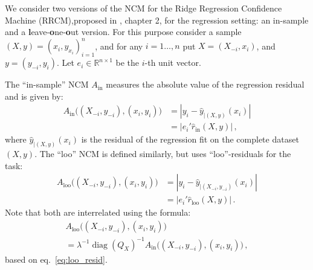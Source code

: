 \documentclass[a4paper,14pt]{extarticle}
\newcommand{\Real}{\mathbb{R}}
\newcommand{\diag}{\mathop{\text{diag}}\nolimits}
\begin{document}
We consider two versions of the NCM for the Ridge Regression Confidence Machine
(RRCM),proposed in \cite{vovk2005}, chapter 2, for the regression setting: an in-sample
and a \textbf{l}eave-\textbf{o}ne-\textbf{o}ut version. For this purpose consider
a sample $(X, y) = (x_i, y_{x_i})_{i=1}^n$, and for any $i=1\ldots, n$ put $X =
(X_{-i}, x_i)$, and $y = (y_{-i}, y_i)$. Let $e_i\in \Real^{n\times 1}$ be the $i$-th
unit vector.

The ``in-sample'' NCM $A_{\text{in}}$ measures the absolute value of the regression
residual and is given by:
\begin{align}
  A_{\text{in}}\bigl((X_{-i}, y_{-i}), (x_i, y_i)\bigr)
    &= |y_i - \hat{y}_{|(X, y)}(x_i)| \nonumber\\
    &= |e_i' \hat{r}_{\text{in}}(X, y)| \label{eq:ins_ncm}
    \,,
\end{align}
where $\hat{y}_{|(X, y)}(x_i)$ is the residual of the regression fit on the complete
dataset $(X, y)$. The ``loo'' NCM is defined similarly, but uses ``loo''-residuals
for the task:
\begin{align*}
  A_{\text{loo}}\bigl((X_{-i}, y_{-i}), (x_i, y_i)\bigr)
    &= |y_i - \hat{y}_{|(X_{-i}, y_{-i})}(x_i)| \\
    &= |e_i' \hat{r}_{\text{loo}}(X, y)|
    \,.
\end{align*}
Note that both are interrelated using the formula:
\begin{multline*}
  A_{\text{loo}}\bigl((X_{-i}, y_{-i}), (x_i, y_i)\bigr)
    \\ = \lambda^{-1} \diag(Q_X)^{-1}
    A_{\text{in}}\bigl((X_{-i}, y_{-i}), (x_i, y_i)\bigr)
    \,,
\end{multline*}
based on eq.~\ref{eq:loo_resid}.
\end{document}
